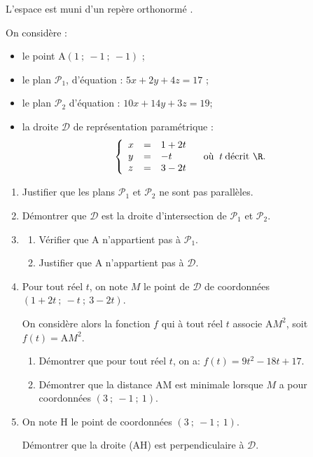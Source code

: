 \medskip

L'espace est muni d'un repère orthonormé \Oijk. 

On considère :

\begin{itemize}
\item[$\bullet~~$]le point A$(1~;~-1~;~-1)$ ;
\item[$\bullet~~$]le plan $\mathcal{P}_1$, d'équation : $5x +2y + 4z= 17$ ;
\item[$\bullet~~$]le plan $\mathcal{P}_2$ d'équation : $10x+ 14y + 3z = 19$;
\item[$\bullet~~$]la droite $\mathcal{D}$ de représentation paramétrique :
\[\left\{\begin{array}{l c l}
x &=& 1+2t\\
y &=& - t\\ 
z&=&3-2t
\end{array}\right. \quad \text{où } \:t \:\text{décrit } \R.\]
\end{itemize}

\begin{enumerate}
\item Justifier que les plans $\mathcal{P}_1$ et $\mathcal{P}_2$ ne sont pas parallèles.
\item Démontrer que $\mathcal{D}$ est la droite d'intersection de $\mathcal{P}_1$ et $\mathcal{P}_2$.
\item 
	\begin{enumerate}
		\item Vérifier que A n'appartient pas à $\mathcal{P}_1$.
		\item Justifier que A n'appartient pas à $\mathcal{D}$.
	\end{enumerate}
\item  Pour tout réel $t$, on note $M$ le point de $\mathcal{D}$ de coordonnées $(1 +2t~;~-t~;~3 - 2t)$.

On considère alors la fonction $f$ qui à tout réel $t$ associe A$M^2$, soit $f(t) = \text{A}M^2$.
	\begin{enumerate}
		\item Démontrer que pour tout réel $t$, on a: $f(t) = 9t^2 - 18t + 17$.
		\item Démontrer que la distance AM est minimale lorsque $M$ a pour
coordonnées $(3~;~-1~;~1)$.
	\end{enumerate}
\item  On note H le point de coordonnées $(3~;~-1~;~1)$.

Démontrer que la droite (AH) est perpendiculaire à $\mathcal{D}$.
\end{enumerate}

\bigskip
